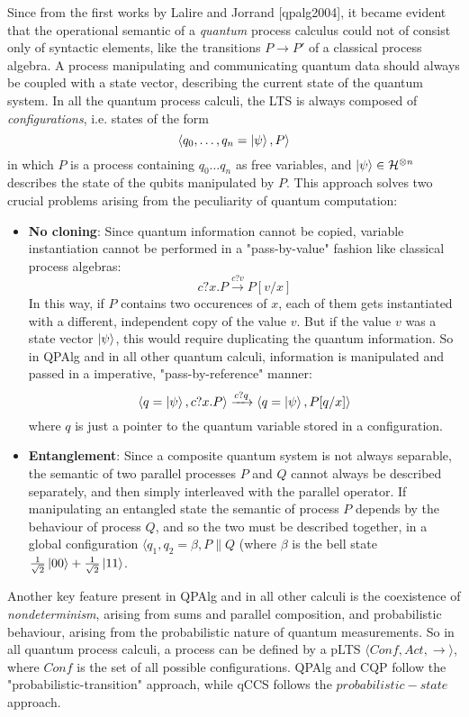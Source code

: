 Since from the first works by Lalire and Jorrand [qpalg2004], it became evident that the operational semantic of a \textit{quantum} process calculus could not of consist only of syntactic elements, like the transitions $P \rightarrow P'$ of a classical process algebra. A process manipulating and communicating quantum data should always be coupled with a state vector, describing the current state of the quantum system. In all the quantum process calculi, the LTS is always composed of \textit{configurations}, i.e. states of the form 
\[
	\langle q_0, \ldots, q_n = \ket{\psi}, P\rangle
\] 
in which $P$ is a process containing $q_0 \ldots q_n$ as free variables, and $\ket{\psi} \in \mathcal{H}^{\otimes n}$  describes the state of the qubits manipulated by $P$. 
This approach solves two crucial problems arising from the peculiarity of quantum computation:\begin{itemize}
\item \textbf{No cloning}: Since quantum information cannot be copied, variable instantiation cannot be performed in a "pass-by-value" fashion like classical process algebras:
	\[ c?x.P \xrightarrow{c?v} P[v/x]
	\] 
In this way, if $P$ contains two occurences of $x$, each of them gets instantiated with a different, independent copy of the value $v$. But if the value $v$ was a state vector $\ket{\psi}$, this would require duplicating the quantum information.
So in QPAlg and in all other quantum calculi, information is manipulated and passed in a imperative, "pass-by-reference" manner:
\[ \langle q=\ket{\psi}, c?x.P \rangle \xrightarrow{c?q} \langle q=\ket{\psi}, P[q/x]\rangle
\]
where $q$ is just a pointer to the quantum variable stored in a configuration.
\item \textbf{Entanglement}: Since a composite quantum system is not always separable, the semantic of two parallel processes $P$ and $Q$ cannot always be described separately, and then simply interleaved with the parallel operator. If manipulating an entangled state the semantic of process $P$ depends by the behaviour of process $Q$, and so the two must be described together, in a global configuration $\langle q_1, q_2 = \beta, P \parallel Q$ (where $\beta$ is the bell state $\frac{1}{\sqrt{2}}\ket{00} + \frac{1}{\sqrt{2}}\ket{11}$. 
\end{itemize}

Another key feature present in QPAlg and in all other calculi is the coexistence of \textit{nondeterminism}, arising from sums and parallel composition, and probabilistic behaviour, arising from the probabilistic nature of quantum measurements. 
So in all quantum process calculi, a process can be defined by a pLTS $\langle Conf, Act, \rightarrow \rangle$, where $Conf$ is the set of all possible configurations. 
QPAlg and CQP follow the "probabilistic-transition" approach, while qCCS follows the $probabilistic-state$ approach.


